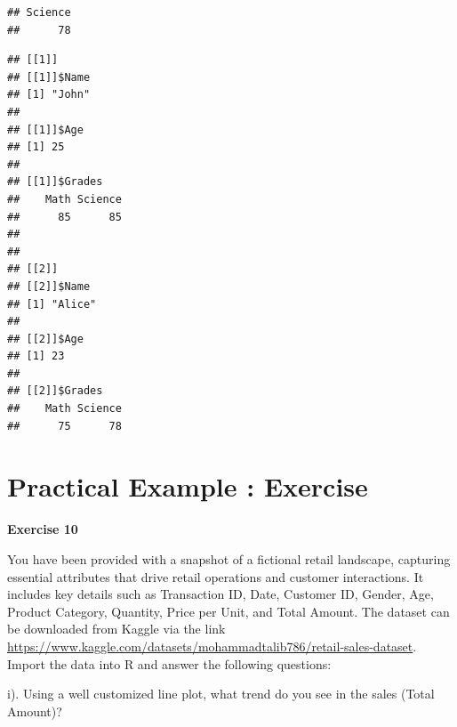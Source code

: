 \documentclass[
]{book}
\newenvironment{Shaded}{\begin{snugshade}}{\end{snugshade}}
\newcommand{\CommentTok}[1]{\textcolor[rgb]{0.56,0.35,0.01}{\textit{#1}}}
\newcommand{\DecValTok}[1]{\textcolor[rgb]{0.00,0.00,0.81}{#1}}
\newcommand{\FunctionTok}[1]{\textcolor[rgb]{0.13,0.29,0.53}{\textbf{#1}}}
\newcommand{\NormalTok}[1]{#1}
\newcommand{\OtherTok}[1]{\textcolor[rgb]{0.56,0.35,0.01}{#1}}
\newcommand{\SpecialCharTok}[1]{\textcolor[rgb]{0.81,0.36,0.00}{\textbf{#1}}}
\newcommand{\StringTok}[1]{\textcolor[rgb]{0.31,0.60,0.02}{#1}}
\begin{document}
\begin{Shaded}
\end{Shaded}

\begin{verbatim}
## Science 
##      78
\end{verbatim}

\begin{Shaded}
\end{Shaded}

\begin{verbatim}
## [[1]]
## [[1]]$Name
## [1] "John"
## 
## [[1]]$Age
## [1] 25
## 
## [[1]]$Grades
##    Math Science 
##      85      85 
## 
## 
## [[2]]
## [[2]]$Name
## [1] "Alice"
## 
## [[2]]$Age
## [1] 23
## 
## [[2]]$Grades
##    Math Science 
##      75      78
\end{verbatim}

\section{Practical Example : Exercise}\label{practical-example-exercise}

\textbf{Exercise 10}

You have been provided with a snapshot of a fictional retail landscape, capturing essential attributes that drive retail operations and customer interactions. It includes key details such as Transaction ID, Date, Customer ID, Gender, Age, Product Category, Quantity, Price per Unit, and Total Amount. The dataset can be downloaded from Kaggle via the link \url{https://www.kaggle.com/datasets/mohammadtalib786/retail-sales-dataset}. Import the data into R and answer the following questions:

i). Using a well customized line plot, what trend do you see in the sales (Total Amount)?
\end{document}
